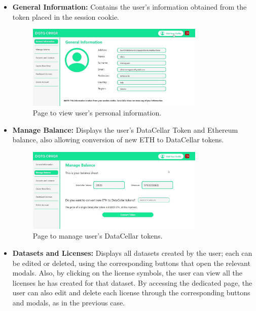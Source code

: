 \begin{itemize}
  \item \textbf{General Information:} Contains the user's information obtained from the token placed in the session cookie.
  
  \begin{figure}[h]  
    \centering
    \includegraphics[width=0.8\textwidth]{Images/c6_6.jpg} 
    \caption{Page to view user's personal information.}
  \end{figure}
  
  \item \textbf{Manage Balance:} Displays the user's DataCellar Token and Ethereum balance, also allowing conversion of new ETH to DataCellar tokens.
  
  \begin{figure}[h]  
    \centering
    \includegraphics[width=0.8\textwidth]{Images/c6_7.jpg} 
    \caption{Page to manage user's DataCellar tokens.}
  \end{figure}
  
  \item \textbf{Datasets and Licenses:} Displays all datasets created by the user; each can be edited or deleted, using the corresponding buttons that open the relevant 
  modals. Also, by clicking on the license symbols, the user can view all the licenses he has created for that dataset. By accessing the dedicated page, the user can also 
  edit and delete each license through the corresponding buttons and modals, as in the previous case. 
  

\end{itemize}

